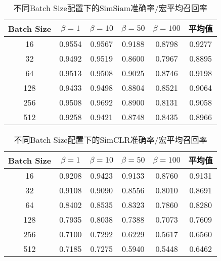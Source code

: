 \documentclass[master]{thesis-uestc}
\begin{document}
\begin{table}[h]
    \centering
    \caption{不同Batch Size配置下的SimSiam准确率/宏平均召回率}
    \begin{tabular}{cccccc}
    \hline
    \textbf{Batch Size} & \textbf{$\beta = 1$} & \textbf{$\beta = 10$} & \textbf{$\beta = 50$} & \textbf{$\beta = 100$} & \textbf{平均值} \\
    \hline
    16   & 0.9554 & 0.9567 & 0.9188 & 0.8798 & 0.9277 \\
    32   & 0.9492 & 0.9519 & 0.8600 & 0.7967 & 0.8895 \\
    64   & 0.9513 & 0.9508 & 0.9025 & 0.8746 & 0.9198 \\
    128  & 0.9433 & 0.9498 & 0.8804 & 0.8521 & 0.9064 \\
    256  & 0.9508 & 0.9692 & 0.8900 & 0.8131 & 0.9058 \\
    512  & 0.9258 & 0.9421 & 0.8748 & 0.8435 & 0.8966 \\
    \hline
    \end{tabular}
    \label{tab:batch_size_simsiam}
\end{table}

\begin{table}[h]
    \centering
    \caption{不同Batch Size配置下的SimCLR准确率/宏平均召回率}
    \begin{tabular}{cccccc}
    \hline
    \textbf{Batch Size} & \textbf{$\beta = 1$} & \textbf{$\beta = 10$} & \textbf{$\beta = 50$} & \textbf{$\beta = 100$} & \textbf{平均值} \\
    \hline
    16   & 0.9208 & 0.9423 & 0.9133 & 0.8760 & 0.9131 \\
    32   & 0.9108 & 0.9090 & 0.8556 & 0.8010 & 0.8691 \\
    64   & 0.8402 & 0.8535 & 0.8323 & 0.7860 & 0.8280 \\
    128  & 0.7935 & 0.8038 & 0.7388 & 0.7073 & 0.7609 \\
    256  & 0.7100 & 0.7292 & 0.6229 & 0.5617 & 0.6560 \\
    512  & 0.7185 & 0.7275 & 0.5940 & 0.5448 & 0.6462 \\
    \hline
    \end{tabular}
    \label{tab:batch_size_simclr_finetune}
\end{table}
\end{document}
